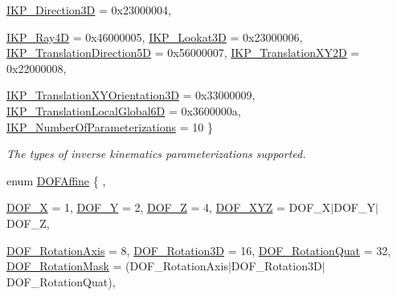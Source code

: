 \begin{DoxyCompactItemize}
\hyperlink{namespaceOpenRAVE_a16f7833e516a35d385ac594a44e44a2ea31424bec585106a5464b4ebe4831acc9}{IKP\_\-Direction3D} = 0x23000004, 
\par
\hyperlink{namespaceOpenRAVE_a16f7833e516a35d385ac594a44e44a2ea4971a1736a1ea39559c0c49601b17533}{IKP\_\-Ray4D} = 0x46000005, 
\hyperlink{namespaceOpenRAVE_a16f7833e516a35d385ac594a44e44a2ea6c4188710cb0a7084725fefd4c80d642}{IKP\_\-Lookat3D} = 0x23000006, 
\hyperlink{namespaceOpenRAVE_a16f7833e516a35d385ac594a44e44a2ea68c40080732ab8a017608e45a2f20d33}{IKP\_\-TranslationDirection5D} = 0x56000007, 
\hyperlink{namespaceOpenRAVE_a16f7833e516a35d385ac594a44e44a2eadcf015cba2fad8597405a442c81e0612}{IKP\_\-TranslationXY2D} = 0x22000008, 
\par
\hyperlink{namespaceOpenRAVE_a16f7833e516a35d385ac594a44e44a2eacb13532b686d552c5a513aa5296a9465}{IKP\_\-TranslationXYOrientation3D} = 0x33000009, 
\hyperlink{namespaceOpenRAVE_a16f7833e516a35d385ac594a44e44a2ea3acb8e5a6b84403f23286a338c46e5a7}{IKP\_\-TranslationLocalGlobal6D} = 0x3600000a, 
\hyperlink{namespaceOpenRAVE_a16f7833e516a35d385ac594a44e44a2eafc80ee4dec1e8de5665d49e6f4bb8d84}{IKP\_\-NumberOfParameterizations} = 10
 \}
\begin{DoxyCompactList}\small\item\em The types of inverse kinematics parameterizations supported. \item\end{DoxyCompactList}\item 
enum \hyperlink{namespaceOpenRAVE_a3016e2185103f3c1bdc5e4482893ca98}{DOFAffine} \{ , \par
\hyperlink{namespaceOpenRAVE_a3016e2185103f3c1bdc5e4482893ca98a631e4be716fa05920e2708264c946507}{DOF\_\-X} =  1, 
\hyperlink{namespaceOpenRAVE_a3016e2185103f3c1bdc5e4482893ca98a052eaa27c587eff647f89537d85414f2}{DOF\_\-Y} =  2, 
\hyperlink{namespaceOpenRAVE_a3016e2185103f3c1bdc5e4482893ca98ab8457ea80d330d3a701781b6bc9a935b}{DOF\_\-Z} =  4, 
\hyperlink{namespaceOpenRAVE_a3016e2185103f3c1bdc5e4482893ca98abf4ca11208a260b3c892db6f3aa87126}{DOF\_\-XYZ} = DOF\_\-X$|$DOF\_\-Y$|$DOF\_\-Z, 
\par
\hyperlink{namespaceOpenRAVE_a3016e2185103f3c1bdc5e4482893ca98a5ee6baa8acb92c310cbc1ece082640d0}{DOF\_\-RotationAxis} =  8, 
\hyperlink{namespaceOpenRAVE_a3016e2185103f3c1bdc5e4482893ca98aa05fc73c237a667dbc010b620704a58b}{DOF\_\-Rotation3D} =  16, 
\hyperlink{namespaceOpenRAVE_a3016e2185103f3c1bdc5e4482893ca98a0bb7484621acd6987a116bc2b6f34a59}{DOF\_\-RotationQuat} =  32, 
\hyperlink{namespaceOpenRAVE_a3016e2185103f3c1bdc5e4482893ca98a8d26ee42cff6b4d775040f3b8b7cda8d}{DOF\_\-RotationMask} = (DOF\_\-RotationAxis$|$DOF\_\-Rotation3D$|$DOF\_\-RotationQuat), 

\end{DoxyCompactItemize}
